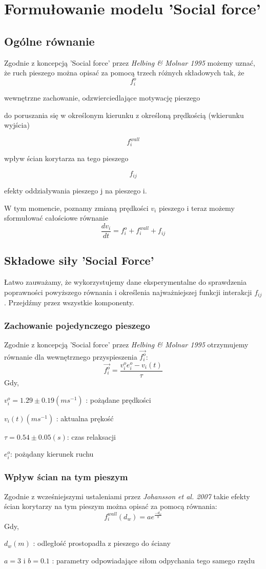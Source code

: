 \chapter{Formułowanie modelu 'Social force'}
\section{Ogólne równanie}
\hspace{4ex}Zgodnie z koncepcją 'Social force' przez {\it Helbing \& Molnar 1995} możemy uznać, że ruch pieszego można opisać za pomocą trzech różnych składowych tak, że 
$$f_{i}^{o}$$  \centerline{wewnętrzne zachowanie, odzwierciedlające motywację pieszego} \centerline{do poruszania się w określonym kierunku z określoną prędkością (wkierunku wyjścia)} 
$$f_{i}^{wall}$$ \centerline{wpływ ścian korytarza na tego pieszego}
$$f_{ij}$$ \centerline{efekty oddziaływania pieszego j na pieszego i.}
\par \medskip W tym momencie, poznamy zmianą prędkości $v_{i}$ pieszego i teraz możemy sformułować całościowe równanie
$$
\frac{dv_{i}}{dt} = f_{i}^{o} + f_{i}^{wall} + f_{ij}
$$
\section{Składowe siły 'Social Force'}
\hspace{4ex}Łatwo zauważamy, że wykorzystujemy dane eksperymentalne do sprawdzenia poprawności powyższego równania i określenia najważniejszej funkcji interakcji $f_{ij}$. Przejdźmy przez wszystkie komponenty.
\subsection{Zachowanie pojedynczego pieszego}
\hspace{4ex}Zgodnie z koncepcją 'Social force' przez {\it Helbing \& Molnar 1995} otrzymujemy równanie dla wewnętrznego przyspieszenia $\vec{f_i^o}$:
$$\vec{f_{i}^{o}} = \frac{v_i^oe_i^o-v_{i}(t)}{\tau}$$
Gdy,\\ \centerline{$v_i^o = 1.29 \pm 0.19(ms^{-1})$ : pożądane prędkości}
\centerline{$v_i(t) (ms^{-1})$ : aktualna prękość}
\centerline{$\tau = 0.54 \pm 0.05(s)$: czas relaksacji}
\centerline{$e_i^o$: pożądany kierunek ruchu}
\subsection{Wpływ ścian na tym pieszym}
\hspace{4ex}Zgodnie z wcześniejszymi ustaleniami przez {\it Johansson et al. 2007} takie efekty ścian korytarzy na tym pieszym można opisać za pomocą równania:
$$
f_i^{wall}(d_w) = ae^{\frac{-d_w}{b}}
$$
Gdy, \\
\centerline{$d_w (m)$ : odległość prostopadła z pieszego do ściany}
\centerline{$a = 3$ i $b = 0.1$ : parametry odpowiadające siłom odpychania tego samego rzędu}
